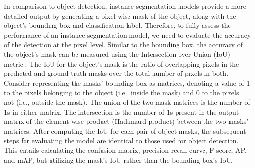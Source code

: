 In comparison to object detection, instance segmentation models provide a more detailed output by generating a pixel-wise mask of the object, along with the object's bounding box and classification label. Therefore, to fully assess the performance of an instance segmentation model, we need to evaluate the accuracy of the detection at the pixel level. Similar to the bounding box, the accuracy of the object's mask can be measured using the Intersection over Union (IoU) metric \cite{instance_segementation_metric_2022}. The IoU for the object's mask is the ratio of overlapping pixels in the predicted and ground-truth masks over the total number of pixels in both. Consider representing the masks' bounding box as matrices, denoting a value of 1 to the pixels belonging to the object (i.e., inside the mask) and 0 to the pixels not (i.e., outside the mask). The union of the two mask matrices is the number of 1s in either matrix. The intersection is the number of 1s present in the output matrix of the element-wise product (Hadamard product) between the two masks' matrices. After computing the IoU for each pair of object masks, the subsequent steps for evaluating the model are identical to those used for object detection. This entails calculating the confusion matrix, precision-recall curve, F-score, AP, and mAP, but utilizing the mask's IoU rather than the bounding box's IoU.